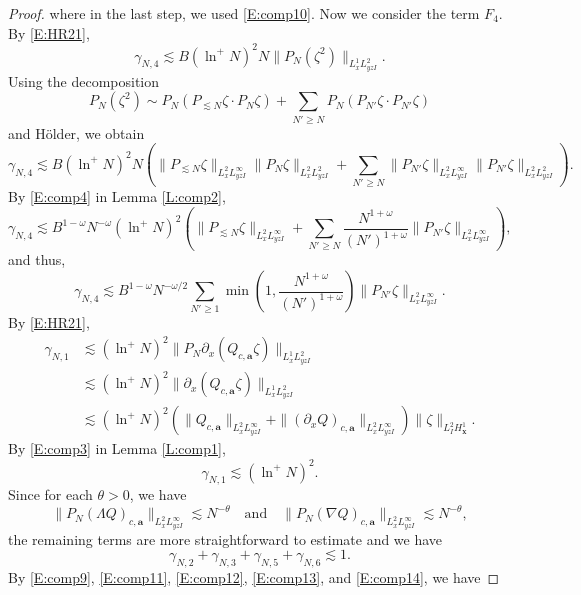 \documentclass[12pt,letterpaper]{amsart}
\theoremstyle{remark}
\numberwithin{equation}{section}
\numberwithin{theorem}{section}
\numberwithin{table}{section}
\begin{document}
\begin{proof}
where in the last step, we used \eqref{E:comp10}.
Now we consider the term $F_4$.  By \eqref{E:HR21},
$$
\gamma_{N,4} \lesssim B (\ln^+ N)^2 N \|P_N(\zeta^2) \|_{L_x^1 L_{yzI}^2}.
$$
Using the decomposition
\begin{equation}
\label{E:comp15}
P_N( \zeta^2) \sim P_N(P_{\lesssim N} \zeta  \cdot P_N \zeta) + \sum_{N'\geq N} P_N( P_{N'}\zeta \cdot P_{N'}\zeta) 
\end{equation}
and H\"older, we obtain
$$
\gamma_{N,4} \lesssim B (\ln^+ N)^2 N ( \|P_{\lesssim N} \zeta \|_{L_x^2 L_{yzI}^\infty} \|P_N \zeta \|_{L_x^2 L_{yzI}^2} + \sum_{N'\geq N} \|P_{N'} \zeta \|_{L_x^2 L_{yzI}^\infty} \|P_{N'} \zeta \|_{L_x^2 L_{yzI}^2} ).
$$
By \eqref{E:comp4} in Lemma \ref{L:comp2},
$$
\gamma_{N,4} \lesssim B^{1-\omega} N^{-\omega} (\ln^+ N)^2 \left( \|P_{\lesssim N} \zeta \|_{L_x^2 L_{yzI}^\infty}  + \sum_{N'\geq N} \frac{N^{1+\omega}}{(N')^{1+\omega}} \|P_{N'} \zeta \|_{L_x^2 L_{yzI}^\infty} \right),
$$
and thus,
\begin{equation}
\label{E:comp12}
\gamma_{N,4}\lesssim B^{1-\omega} N^{-\omega/2} \sum_{N' \geq 1} \min\left( 1 , \frac{N^{1+\omega}}{(N')^{1+\omega}}\right) \|P_{N'} \zeta \|_{L_x^2 L_{y z I}^\infty}.
\end{equation}
By \eqref{E:HR21},
\begin{align*}
\gamma_{N,1} &\lesssim (\ln^+ N)^2  \|P_N\partial_x ( Q_{c,\mathbf{a}} \zeta) \|_{L_x^1 L_{y z I}^2}\\
&\lesssim (\ln^+ N)^2  \|\partial_x ( Q_{c,\mathbf{a}} \zeta) \|_{L_x^1 L_{y z I}^2} \\
&\lesssim (\ln^+ N)^2 ( \|Q_{c,\mathbf{a}}\|_{L_x^2 L_{y z I}^\infty}+\|(\partial_x Q)_{c,\mathbf{a}}\|_{L_x^2 L_{y z I}^\infty}) \| \zeta \|_{L_I^2 H_{\mathbf{x}}^1}.
\end{align*}
By \eqref{E:comp3} in Lemma \ref{L:comp1},
\begin{equation}
\label{E:comp13}
\gamma_{N,1} \lesssim (\ln^+ N)^2.
\end{equation}
Since for each $\theta>0$, we have
$$
\|P_N (\Lambda Q)_{c,\mathbf{a}} \|_{L_x^2 L_{y z I}^\infty} \lesssim N^{-\theta} \quad \mbox{and} \quad 
\|P_N (\nabla Q)_{c,\mathbf{a}} \|_{L_x^2 L_{y z I}^\infty} \lesssim N^{-\theta},
$$
the remaining terms are more straightforward to estimate and we have
\begin{equation}
\label{E:comp14}
\gamma_{N,2} + \gamma_{N,3} + \gamma_{N,5} + \gamma_{N,6} \lesssim 1.
\end{equation}
By \eqref{E:comp9}, \eqref{E:comp11}, \eqref{E:comp12}, \eqref{E:comp13}, and \eqref{E:comp14}, we have

\end{proof}
\end{document}
